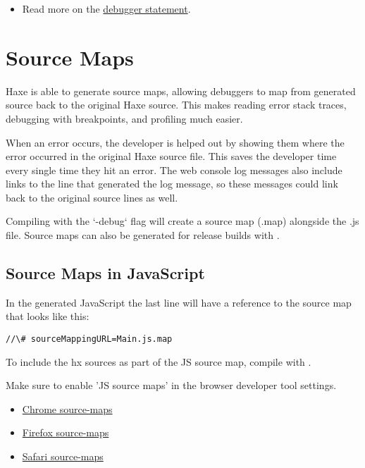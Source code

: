 \begin{itemize}
	\item Read more on the \href{https://developer.mozilla.org/en/docs/Web/JavaScript/Reference/Statements/debugger}{debugger statement}.
\end{itemize}


\section{Source Maps}
\label{debugging-source-map}

Haxe is able to generate source maps, allowing debuggers to map from generated source back to the original Haxe source. This makes reading error stack traces, debugging with breakpoints, and profiling much easier.

When an error occurs, the developer is helped out by showing them where the error occurred in the original Haxe source file. This saves the developer time every single time they hit an error. The web console log messages also include links to the line that generated the log message, so these messages could link back to the original source lines as well. 

Compiling with the `-debug` flag will create a source map (.map) alongside the .js file. Source maps can also be generated for release builds with .


\subsection{Source Maps in JavaScript}
\label{debugging-source-map-javascript}

In the generated JavaScript the last line will have a reference to the source map that looks like this:

\begin{lstlisting}
//\# sourceMappingURL=Main.js.map
\end{lstlisting}

To include the hx sources as part of the JS source map, compile with .

Make sure to enable 'JS source maps' in the browser developer tool settings. 

\begin{itemize}
	\item \href{https://developers.google.com/web/tools/chrome-devtools/debug/readability/source-maps}{Chrome source-maps}
	\item \href{https://developer.mozilla.org/en-US/docs/Tools/Debugger/How_to/Use_a_source_map}{Firefox source-maps}
	\item \href{https://developer.apple.com/library/safari/documentation/AppleApplications/Conceptual/Safari_Developer_Guide/ResourcesandtheDOM/ResourcesandtheDOM.html#//apple_ref/doc/uid/TP40007874-CH3-SW2}{Safari source-maps}
\end{itemize}


